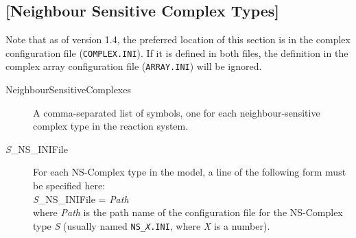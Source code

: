 \subsection{[Neighbour Sensitive Complex Types]}
Note that as of version 1.4, the preferred location of this section is
in the complex configuration file (\texttt{COMPLEX.INI}).  If it is
defined in both files, the definition in the complex array
configuration file (\texttt{ARRAY.INI}) will be ignored.

\begin{description}
\item[NeighbourSensitiveComplexes] A comma-separated list of symbols,
  one for each neighbour-sensitive complex type in the reaction
  system.
  
\item[\emph{S}\_NS\_INIFile] For each NS-Complex type in the model, a
  line of the following form must be specified here:\\[\baselineskip]
  \emph{S}\_NS\_INIFile = \emph{Path}\\[\baselineskip]
  where \emph{Path} is the path name of the configuration file for the
  NS-Complex type \emph{S} (usually named \texttt{NS\_\emph{X}.INI},
  where \emph{X} is a number).
\end{description}

